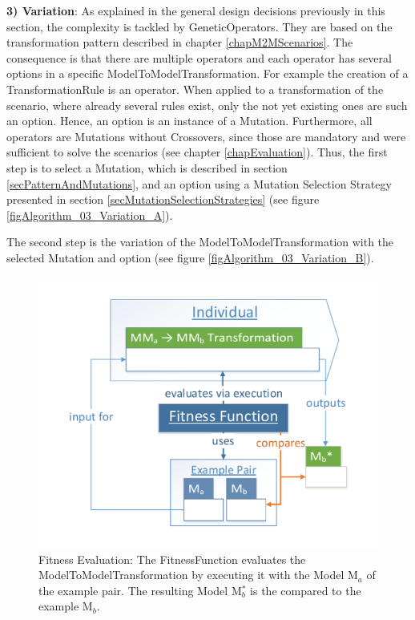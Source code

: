 \textbf{3) Variation}: As explained in the general design decisions previously in this section, the complexity is tackled by \glspl{GeneticOperator}. They are based on the transformation pattern described in chapter \ref{chapM2MScenarios}. The consequence is that there are multiple operators and each operator has several options in a specific \gls{ModelToModelTransformation}. For example the creation of a \gls{TransformationRule} is an operator. When applied to a transformation of the scenario, where already several rules exist, only the not yet existing ones are such an option. Hence, an option is an instance of a \gls{Mutation}. Furthermore, all operators are \glspl{Mutation} without \glspl{Crossover}, since those are mandatory and were sufficient to solve the scenarios (see chapter \ref{chapEvaluation}). Thus, the first step is to select a \gls{Mutation}, which is described in section \ref{secPatternAndMutations}, and an option using a Mutation Selection Strategy presented in section \ref{secMutationSelectionStrategies} (see figure \ref{figAlgorithm_03_Variation_A}).

The second step is the variation of the \gls{ModelToModelTransformation} with the selected \gls{Mutation} and option (see figure \ref{figAlgorithm_03_Variation_B}).

\begin{figure}[htb]
	\centering
	\includegraphics[scale=0.5, trim=0cm 1cm 0cm 1cm, clip=true]{Images/Algorithm_04_FitnessEvaluation.pdf} 
	\caption{Fitness Evaluation: The \gls{FitnessFunction} evaluates the \gls{ModelToModelTransformation} by executing it with the \gls{Model} M$_a$ of the example pair. The resulting \gls{Model} M$_b^*$ is the compared to the example M$_b$.}
	\label{figAlgorithm_04_FitnessEvaluation}
\end{figure}

